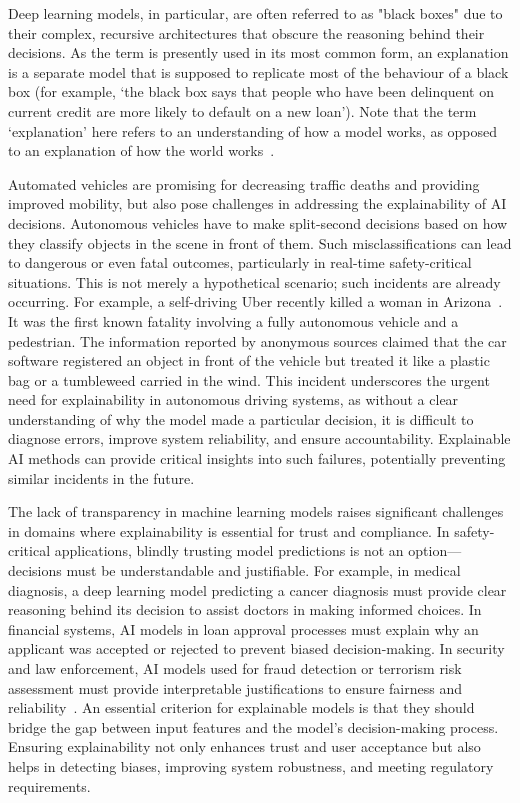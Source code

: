 Deep learning models, in particular, are often referred to as "black boxes" due to their complex, recursive architectures that obscure the reasoning behind their decisions. As the term is presently used in its most common form, an explanation is a separate model that is supposed to replicate most of the behaviour of a black box (for example, ‘the black box says that people who have been delinquent on current credit are more likely to default on a new loan’). Note that the term ‘explanation’ here refers to an understanding of how a model works, as opposed to an explanation of how the world works~\cite{Rudin2019}.

Automated vehicles are promising for decreasing traffic deaths and providing improved mobility, but also pose challenges in addressing the explainability of AI decisions. Autonomous vehicles have to make split-second decisions based on how they classify objects in the scene in front of them. Such misclassifications can lead to dangerous or even fatal outcomes, particularly in real-time safety-critical situations. This is not merely a hypothetical scenario; such incidents are already occurring. For example, a self-driving Uber recently killed a woman in Arizona~\autocite{marshall2019uber}. It was the first known fatality involving a fully autonomous vehicle and a pedestrian. The information reported by anonymous sources claimed that the car software registered an object in front of the vehicle but treated it like a plastic bag or a tumbleweed carried in the wind. This incident underscores the urgent need for explainability in autonomous driving systems, as without a clear understanding of why the model made a particular decision, it is difficult to diagnose errors, improve system reliability, and ensure accountability. Explainable AI methods can provide critical insights into such failures, potentially preventing similar incidents in the future.


The lack of transparency in machine learning models raises significant challenges in domains where explainability is essential for trust and compliance. In safety-critical applications, blindly trusting model predictions is not an option—decisions must be understandable and justifiable. For example, in medical diagnosis, a deep learning model predicting a cancer diagnosis must provide clear reasoning behind its decision to assist doctors in making informed choices. In financial systems, AI models in loan approval processes must explain why an applicant was accepted or rejected to prevent biased decision-making. In security and law enforcement, AI models used for fraud detection or terrorism risk assessment must provide interpretable justifications to ensure fairness and reliability~\autocite{ribeiro2016ML}. An essential criterion for explainable models is that they should bridge the gap between input features and the model’s decision-making process. Ensuring explainability not only enhances trust and user acceptance but also helps in detecting biases, improving system robustness, and meeting regulatory requirements.

